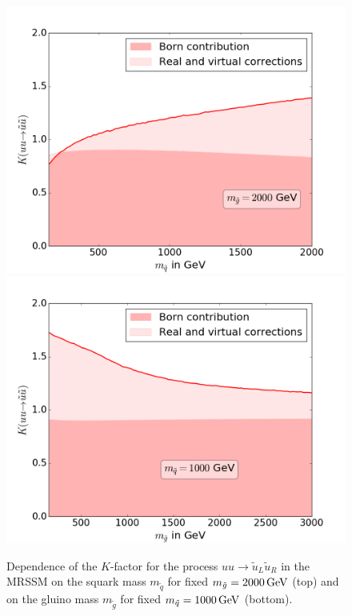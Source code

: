 \begin{figure}[!htpb]
\begin{center}
\includegraphics[scale=.5]{figures/MRSSM_uu_susu_Kfactors_msg=2000GeV.png}
\includegraphics[scale=.5]{figures/MRSSM_uu_susu_Kfactors_msq=1000GeV.png}
\caption{Dependence of the $K$-factor for the process $uu \to \tilde{u}_L\tilde{u}_R$ in the MRSSM on the squark mass $m_{\tilde{q}}$ for fixed $m_{\tilde{g}} = \unit[2000]{GeV}$ (top) and on the gluino mass $m_{\tilde{g}}$ for fixed $m_{\tilde{q}} = \unit[1000]{GeV}$ (bottom).}\label{fig:1LXsection_fixed_m}
\end{center}
\end{figure}
